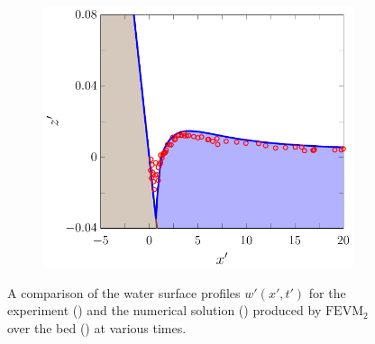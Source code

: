 \begin{figure}
\begin{subfigure}{0.5\textwidth}
		\vspace{0.5cm}
	\end{subfigure}
	\begin{subfigure}{0.5\textwidth}
		\includegraphics[width=\textwidth]{./chp6/figures/Experiment/Synolakis/H0p0185/FEVM/70s.pdf}
		\vspace{0.5cm}
	\end{subfigure}
	\caption{A comparison of the water surface profiles $w'(x',t')$ for the experiment () and the numerical solution () produced by $\text{FEVM}_2$ over the bed () at various times.}
	\label{fig:SynolakisFEVMNoBreak}
\end{figure}
